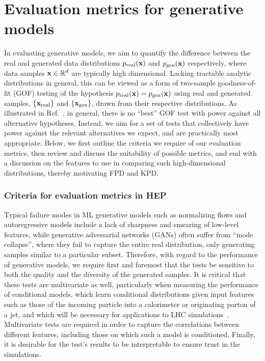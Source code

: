\section{Evaluation metrics for generative models}
\label{sec:04_evaluating_metrics}

In evaluating generative models, we aim to quantify the difference between the real and generated data distributions $p_{\mathrm{real}}(\mathbf{x})$ and $p_{\mathrm{gen}}(\mathbf{x})$ respectively, where data samples $\mathbf{x} \in \mathbb{R}^d$ are typically high dimensional.
Lacking tractable analytic distributions in general, this can be viewed as a form of two-sample goodness-of-fit (GOF) testing of the hypothesis $p_{\mathrm{real}}(\mathbf{x}) = p_{\mathrm{gen}}(\mathbf{x})$ using real and generated samples, $\{\mathbf{x}_{\mathrm{real}}\}$ and $\{\mathbf{x}_{\mathrm{gen}}\}$, drawn from their respective distributions.
As illustrated in Ref.~\cite{cousins_gof}, in general, there is no ``best'' GOF test with power against all alternative hypotheses.
Instead, we aim for a set of tests that collectively have power against the relevant alternatives we expect, and are practically most appropriate.
Below, we first outline the criteria we require of our evaluation metrics, then review and discuss the suitability of possible metrics, and end with a discussion on the features to use in comparing such high-dimensional distributions, thereby motivating FPD and KPD.

\subsubsection{Criteria for evaluation metrics in HEP}
\label{sec:04_evaluating_criteria}

Typical failure modes in ML generative models such as normalizing flows and autoregressive models include a lack of sharpness and smearing of low-level features, while generative adversarial networks (GANs) often suffer from ``mode collapse'', where they fail to capture the entire real distribution, only generating samples similar to a particular subset.
Therefore, with regard to the performance of generative models, we require first and foremost that the tests be sensitive to both the quality and the diversity of the generated samples.
It is critical that these tests are multivariate as well, particularly when measuring the performance of conditional models, which learn conditional distributions given input features such as those of the incoming particle into a calorimeter or originating parton of a jet, and which will be necessary for applications to LHC simulations~\cite{Butter:2022rso}.
Multivariate tests are required in order to capture the correlations between different features, including those on which such a model is conditioned.
Finally, it is desirable for the test's results to be interpretable to ensure trust in the simulations.

